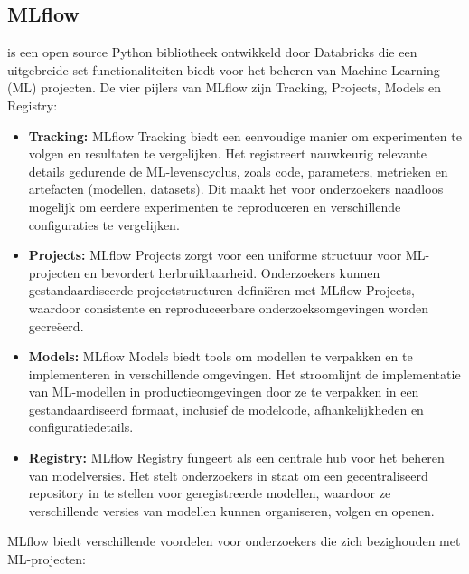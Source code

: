 \subsection{MLflow}

\textcite{MLflow2023} is een open source Python bibliotheek ontwikkeld door Databricks die een uitgebreide set functionaliteiten biedt voor het beheren van Machine Learning (ML) projecten. De vier pijlers van MLflow zijn Tracking, Projects, Models en Registry:

\begin{itemize}
    \item \textbf{Tracking:} MLflow Tracking biedt een eenvoudige manier om experimenten te volgen en resultaten te vergelijken. Het registreert nauwkeurig relevante details gedurende de ML-levenscyclus, zoals code, parameters, metrieken en artefacten (modellen, datasets). Dit maakt het voor onderzoekers naadloos mogelijk om eerdere experimenten te reproduceren en verschillende configuraties te vergelijken.
    \item \textbf{Projects:} MLflow Projects zorgt voor een uniforme structuur voor ML-projecten en bevordert herbruikbaarheid. Onderzoekers kunnen gestandaardiseerde projectstructuren definiëren met MLflow Projects, waardoor consistente en reproduceerbare onderzoeksomgevingen worden gecreëerd.
    \item \textbf{Models:} MLflow Models biedt tools om modellen te verpakken en te implementeren in verschillende omgevingen. Het stroomlijnt de implementatie van ML-modellen in productieomgevingen door ze te verpakken in een gestandaardiseerd formaat, inclusief de modelcode, afhankelijkheden en configuratiedetails.
    \item \textbf{Registry:} MLflow Registry fungeert als een centrale hub voor het beheren van modelversies. Het stelt onderzoekers in staat om een gecentraliseerd repository in te stellen voor geregistreerde modellen, waardoor ze verschillende versies van modellen kunnen organiseren, volgen en openen.
\end{itemize}


MLflow biedt verschillende voordelen voor onderzoekers die zich bezighouden met ML-projecten:

